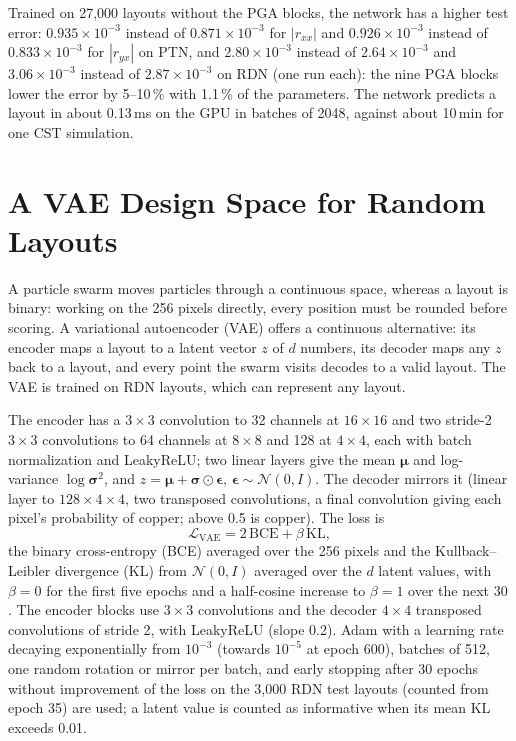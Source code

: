 \documentclass[journal]{IEEEtran}
\newcommand{\e}[2]{\ensuremath{#1{\times}10^{#2}}}
\begin{document}
Trained on 27,000 layouts without the PGA blocks, the network has a higher test error: \e{0.935}{-3} instead of \e{0.871}{-3} for $|r_{xx}|$ and \e{0.926}{-3} instead of \e{0.833}{-3} for $|r_{yx}|$ on PTN, and \e{2.80}{-3} instead of \e{2.64}{-3} and \e{3.06}{-3} instead of \e{2.87}{-3} on RDN (one run each): the nine PGA blocks lower the error by 5--10\,\% with 1.1\,\% of the parameters. The network predicts a layout in about 0.13\,ms on the GPU in batches of 2048, against about 10\,min for one CST simulation.

\section{A VAE Design Space for Random Layouts}\label{sec:vae}
A particle swarm moves particles through a continuous space, whereas a layout is binary: working on the 256 pixels directly, every position must be rounded before scoring. A variational autoencoder (VAE) \cite{kingma,ma_vae} offers a continuous alternative: its encoder maps a layout to a latent vector $z$ of $d$ numbers, its decoder maps any $z$ back to a layout, and every point the swarm visits decodes to a valid layout. The VAE is trained on RDN layouts, which can represent any layout.

The encoder has a $3\times3$ convolution to 32 channels at $16\times16$ and two stride-2 $3\times3$ convolutions to 64 channels at $8\times8$ and 128 at $4\times4$, each with batch normalization and LeakyReLU; two linear layers give the mean $\boldsymbol\mu$ and log-variance $\log\boldsymbol\sigma^2$, and $z=\boldsymbol\mu+\boldsymbol\sigma\odot\boldsymbol\epsilon$, $\boldsymbol\epsilon\sim\mathcal{N}(0,I)$. The decoder mirrors it (linear layer to $128\times4\times4$, two transposed convolutions, a final convolution giving each pixel's probability of copper; above 0.5 is copper). The loss is
\begin{equation}
\mathcal{L}_{\mathrm{VAE}}=2\,\mathrm{BCE}+\beta\,\mathrm{KL},
\label{eq:vae}
\end{equation}
the binary cross-entropy (BCE) averaged over the 256 pixels and the Kullback--Leibler divergence (KL) from $\mathcal N(0,I)$ averaged over the $d$ latent values, with $\beta=0$ for the first five epochs and a half-cosine increase to $\beta=1$ over the next 30 \cite{bowman}. The encoder blocks use $3\times3$ convolutions and the decoder $4\times4$ transposed convolutions of stride 2, with LeakyReLU (slope 0.2). Adam \cite{adam} with a learning rate decaying exponentially from $10^{-3}$ (towards $10^{-5}$ at epoch 600), batches of 512, one random rotation or mirror per batch, and early stopping after 30 epochs without improvement of the loss on the 3,000 RDN test layouts (counted from epoch 35) are used; a latent value is counted as informative when its mean KL exceeds 0.01.
\end{document}
